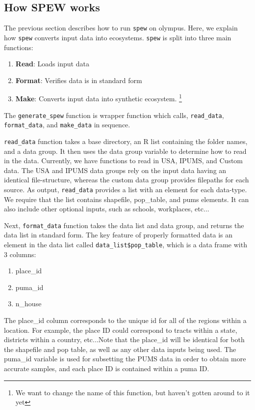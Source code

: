 \documentclass{article}
\begin{document}
\subsection{How SPEW works}
The previous section describes how to run \verb|spew| on olympus. Here, we explain how \verb|spew| converts input data into ecosystems. \verb|spew| is split into three main functions:

\begin{enumerate}
	\item \textbf{Read}: Loads input data
	\item \textbf{Format}: Verifies data is in standard form 
	\item \textbf{Make}: Converts input data into synthetic ecosystem. \footnote{We want to change the name of this function, but haven't gotten around to it yet}
\end{enumerate}

The \verb|generate_spew| function is  wrapper function which calls, \verb|read_data|, \verb|format_data|, and \verb|make_data| in sequence.

\verb|read_data| function takes a base directory, an R list containing the folder names, and a data group. It then uses the data group variable to determine how to read in the data. Currently, we have functions to read in USA, IPUMS, and Custom data. The USA and IPUMS data groups rely on the input data having an identical file-structure, whereas the custom data group provides filepaths for each source. As output, \verb|read_data| provides a list with an element for each data-type. We require that the list contains shapefile, pop\_table, and pums elements. It can also include other optional inputs, such as schools, workplaces, etc...

Next, \verb|format_data| function takes the data list and data group, and returns the data list in standard form. The key feature of properly formatted data is an element in the data list called \verb|data_list$pop_table|, which is a data frame with 3 columns:

\begin{enumerate}
	\item place\_id
	\item puma\_id 
	\item n\_house 
\end{enumerate}

The place\_id column corresponds to the unique id for all of the regions within a location. For example, the place ID could correspond to tracts within a state, districts within a country, etc...Note that the place\_id will be identical for both the shapefile and pop table, as well as any other data inputs being used. The puma\_id variable is used for subsetting the PUMS data in order to obtain more accurate samples, and each place ID is contained within a puma ID. 
\end{document}
